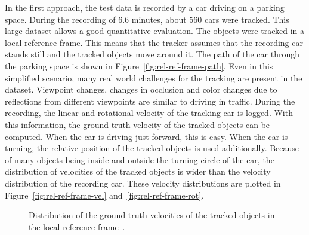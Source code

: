 \documentclass[twoside,a4paper,article]{combine}
\begin{document}
In the first approach, the test data is recorded by a car driving on a
parking space. During the recording of $6.6$ minutes, about $560$ cars
were tracked. This large dataset allows a good quantitative
evaluation. The objects were tracked in a local reference frame. This
means that the tracker assumes that the recording car stands still and
the tracked objects move around it. The path of the car through the
parking space is shown in Figure~\ref{fig:rel-ref-frame-path}. Even in
this simplified scenario, many real world challenges for the tracking
are present in the dataset. Viewpoint changes, changes in occlusion
and color changes due to reflections from different viewpoints are
similar to driving in traffic. During the recording, the linear and
rotational velocity of the tracking car is logged. With this
information, the ground-truth velocity of the tracked objects can be
computed. When the car is driving just forward, this is easy. When the car
is turning, the relative position of the tracked objects is used
additionally. Because of many objects being inside and outside the
turning circle of the car, the distribution of velocities of the
tracked objects is wider than the velocity distribution of the recording
car. These velocity distributions are plotted in
Figure~\ref{fig:rel-ref-frame-vel} and~\ref{fig:rel-ref-frame-rot}.
\begin{figure}
  \center
  \caption{Distribution of the ground-truth velocities of the tracked
    objects in the local reference frame~\cite{paper}.}
  \label{fig:rel-ref-frame}
\end{figure}
\end{document}
